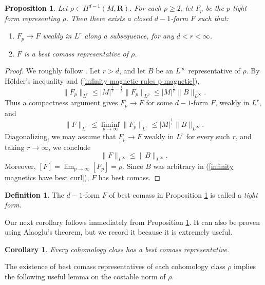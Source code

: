 \documentclass[reqno,11pt]{amsart}
\newcommand{\RR}{\mathbf{R}}
\newcommand{\dfn}[1]{\emph{#1}\index{#1}}
\newtheorem{proposition}[theorem]{Proposition}
\newtheorem{corollary}[theorem]{Corollary}
\theoremstyle{definition}
\newtheorem{definition}[theorem]{Definition}
\numberwithin{equation}{section}
\begin{document}
\begin{proposition}\label{existence infinity}
Let $\rho \in H^{d - 1}(M, \RR)$.
For each $p \geq 2$, let $F_p$ be the $p$-tight form representing $\rho$. Then there exists a closed $d - 1$-form $F$ such that:
\begin{enumerate}
\item $F_p \to F$ weakly in $L^r$ along a subsequence, for any $d < r < \infty$.
\item $F$ is a best comass representative of $\rho$.
\end{enumerate}
\end{proposition}
\begin{proof}
We roughly follow \cite[\S3]{Lindqvist14}.
Let $r > d$, and let $B$ be an $L^\infty$ representative of $\rho$.
By H\"older's inequality and (\ref{infinity magnetic rules p magnetic}),
\begin{equation}\label{uniform bounds in p by best curl}
	\|F_p\|_{L^r} \leq |M|^{\frac{1}{r} - \frac{1}{p}} \|F_p\|_{L^p} \leq |M|^{\frac{1}{r}} \|B\|_{L^\infty}.
\end{equation}
Thus a compactness argument gives $F_p \to F$ for some $d - 1$-form $F$, weakly in $L^r$, and 
$$\|F\|_{L^r} \leq \liminf_{p \to \infty} \|F_p\|_{L^r} \leq |M|^{\frac{1}{r}} \|B\|_{L^\infty}.$$
Diagonalizing, we may assume that $F_p \to F$ weakly in $L^r$ for every such $r$, and taking $r \to \infty$, we conclude 
\begin{equation}\label{infinity magnetics have best curl}
	\|F\|_{L^\infty} \leq \|B\|_{L^\infty}.
\end{equation}
Moreover, $[F] = \lim_{p \to \infty} [F_p] = \rho$.
Since $B$ was arbitrary in (\ref{infinity magnetics have best curl}), $F$ has best comass.
\end{proof}

\begin{definition}
The $d - 1$-form $F$ of best comass in Proposition \ref{existence infinity} is called a \dfn{tight form}.
\end{definition}

Our next corollary follows immediately from Proposition \ref{existence infinity}.
It can also be proven using Alaoglu's theorem, but we record it because it is extremely useful.

\begin{corollary}
Every cohomology class has a best comass representative.
\end{corollary}

The existence of best comass representatives of each cohomology class $\rho$ implies the following useful lemma on the costable norm of $\rho$.
\end{document}
